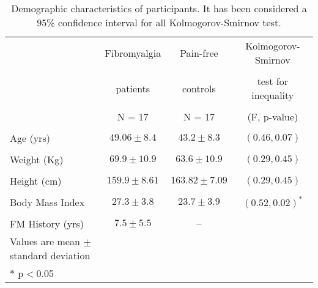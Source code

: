 \begin{table}[ht]
\caption{Demographic characteristics of participants. It has been considered a 95\% confidence interval for all Kolmogorov-Smirnov test.}
\begin{tabular}{lccc}
	\hline 
	& Fibromyalgia & Pain-free  & Kolmogorov-Smirnov \\ \\
	 & patients & controls & test for inequality \\ \\
 	 & N = 17 & N = 17 & (F, p-value)
 \\ \\ \hline
 Age (yrs)	& $49.06 \pm 8.4$ &	$43.2 \pm 8.3$ &	$(0.46, 0.07)$
  \\ \\ 
 Weight (Kg)	& $69.9 \pm 10.9$ &	$63.6 \pm 10.9$ &	$(0.29, 0.45)$
   \\ \\ 
 Height (cm)	& $159.9 \pm 8.61$ &	$163.82 \pm 7.09$ &	$(0.29, 0.45)$
   \\ \\ 
 Body Mass Index	& $27.3 \pm 3.8$ &	$23.7 \pm 3.9$ &	$(0.52, 0.02)^\ast$
    \\ \\ 
FM History (yrs)	& $7.5 \pm 5.5$ &	-- &
 \\ \hline
Values are mean $\pm$ standard deviation\\
$*$ p$<$0.05
\end{tabular}
\label{tab:demography}
\end{table}
